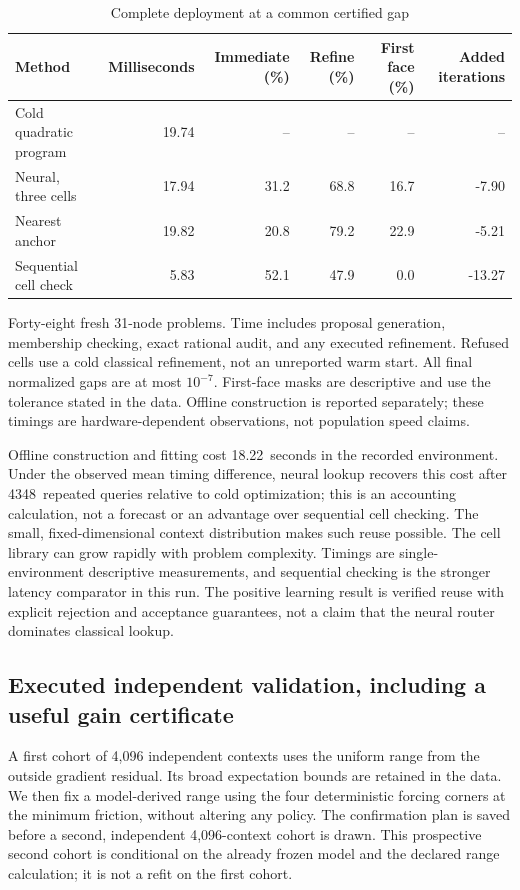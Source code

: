\documentclass[11pt,letterpaper]{article}
\theoremstyle{definition}
\newcommand{\1}{\mathbf 1}
\newcommand{\RThirteenOffline}{18.22}
\newcommand{\RThirteenBreakEven}{4348}
\begin{document}
\begin{table}[t]
\centering\small
\caption{Complete deployment at a common certified gap}\label{tab:r13-matched}
\begin{tabular}{lrrrrr}\toprule
Method & Milliseconds & Immediate (\%) & Refine (\%) & First face (\%) & Added iterations \\\midrule
Cold quadratic program & 19.74 & -- & -- & -- & -- \\
Neural, three cells & 17.94 & 31.2 & 68.8 & 16.7 & -7.90 \\
Nearest anchor & 19.82 & 20.8 & 79.2 & 22.9 & -5.21 \\
Sequential cell check & 5.83 & 52.1 & 47.9 & 0.0 & -13.27 \\
\bottomrule\end{tabular}
\par\smallskip\begin{minipage}{.96\textwidth}\footnotesize Forty-eight fresh 31-node problems. Time includes proposal generation, membership checking, exact rational audit, and any executed refinement. Refused cells use a cold classical refinement, not an unreported warm start. All final normalized gaps are at most $10^{-7}$. First-face masks are descriptive and use the tolerance stated in the data. Offline construction is reported separately; these timings are hardware-dependent observations, not population speed claims.\end{minipage}
\end{table}


Offline construction and fitting cost \RThirteenOffline\ seconds in the recorded environment. Under the observed mean timing difference, neural lookup recovers this cost after \RThirteenBreakEven\ repeated queries relative to cold optimization; this is an accounting calculation, not a forecast or an advantage over sequential cell checking. The small, fixed-dimensional context distribution makes such reuse possible. The cell library can grow rapidly with problem complexity. Timings are single-environment descriptive measurements, and sequential checking is the stronger latency comparator in this run. The positive learning result is verified reuse with explicit rejection and acceptance guarantees, not a claim that the neural router dominates classical lookup.

\subsection{Executed independent validation, including a useful gain certificate}
A first cohort of 4,096 independent contexts uses the uniform range from the outside gradient residual. Its broad expectation bounds are retained in the data. We then fix a model-derived range using the four deterministic forcing corners at the minimum friction, without altering any policy. The confirmation plan is saved before a second, independent 4,096-context cohort is drawn. This prospective second cohort is conditional on the already frozen model and the declared range calculation; it is not a refit on the first cohort.
\end{document}
